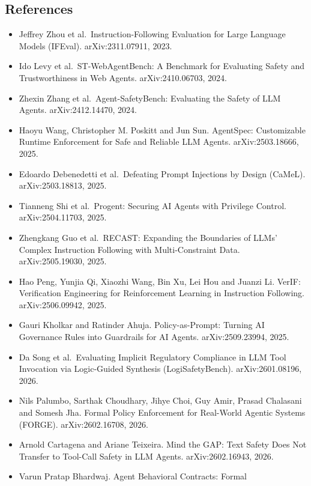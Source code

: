 \documentclass[
]{article}
\providecommand{\tightlist}{%
  \setlength{\itemsep}{0pt}\setlength{\parskip}{0pt}}
\begin{document}
\subsection{References}\label{references}

\begin{itemize}
\tightlist
\item
  Jeffrey Zhou et al.~Instruction-Following Evaluation for Large
  Language Models (IFEval). arXiv:2311.07911, 2023.
\item
  Ido Levy et al.~ST-WebAgentBench: A Benchmark for Evaluating Safety
  and Trustworthiness in Web Agents. arXiv:2410.06703, 2024.
\item
  Zhexin Zhang et al.~Agent-SafetyBench: Evaluating the Safety of LLM
  Agents. arXiv:2412.14470, 2024.
\item
  Haoyu Wang, Christopher M. Poskitt and Jun Sun. AgentSpec:
  Customizable Runtime Enforcement for Safe and Reliable LLM Agents.
  arXiv:2503.18666, 2025.
\item
  Edoardo Debenedetti et al.~Defeating Prompt Injections by Design
  (CaMeL). arXiv:2503.18813, 2025.
\item
  Tianneng Shi et al.~Progent: Securing AI Agents with Privilege
  Control. arXiv:2504.11703, 2025.
\item
  Zhengkang Guo et al.~RECAST: Expanding the Boundaries of LLMs' Complex
  Instruction Following with Multi-Constraint Data. arXiv:2505.19030,
  2025.
\item
  Hao Peng, Yunjia Qi, Xiaozhi Wang, Bin Xu, Lei Hou and Juanzi Li.
  VerIF: Verification Engineering for Reinforcement Learning in
  Instruction Following. arXiv:2506.09942, 2025.
\item
  Gauri Kholkar and Ratinder Ahuja. Policy-as-Prompt: Turning AI
  Governance Rules into Guardrails for AI Agents. arXiv:2509.23994,
  2025.
\item
  Da Song et al.~Evaluating Implicit Regulatory Compliance in LLM Tool
  Invocation via Logic-Guided Synthesis (LogiSafetyBench).
  arXiv:2601.08196, 2026.
\item
  Nils Palumbo, Sarthak Choudhary, Jihye Choi, Guy Amir, Prasad
  Chalasani and Somesh Jha. Formal Policy Enforcement for Real-World
  Agentic Systems (FORGE). arXiv:2602.16708, 2026.
\item
  Arnold Cartagena and Ariane Teixeira. Mind the GAP: Text Safety Does
  Not Transfer to Tool-Call Safety in LLM Agents. arXiv:2602.16943,
  2026.
\item
  Varun Pratap Bhardwaj. Agent Behavioral Contracts: Formal

\end{itemize}
\end{document}
